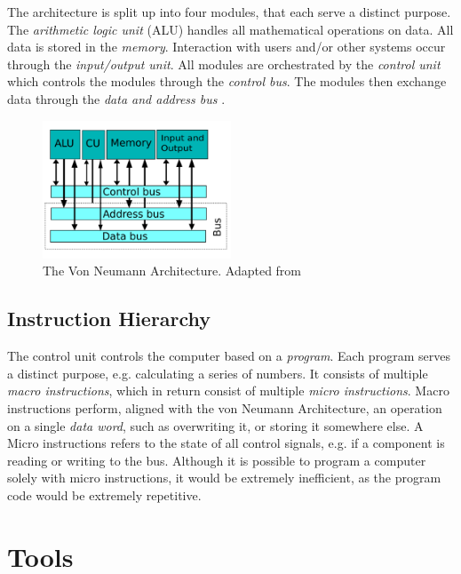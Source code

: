 The architecture is split up into four modules, that each serve a distinct purpose. The \textit{arithmetic logic unit} (ALU) handles all mathematical operations on data. All data is stored in the \textit{memory}. Interaction with users and/or other systems occur through the \textit{input/output unit}. All modules are orchestrated by the \textit{control unit} which controls the modules through the \textit{control bus}. The modules then exchange data through the \textit{data and address bus} \cite{vonneumann1} \cite{vonneumann2}.

\begin{figure}[H]
  \begin{center}
    \includegraphics[width=0.5\textwidth]{figures/VNA}
  \end{center}
  \caption{The Von Neumann Architecture. Adapted from \cite{fig-vna}}\label{fig:vna}
\end{figure}

\subsection{Instruction Hierarchy}
The control unit controls the computer based on a \textit{program}. Each program serves a distinct purpose, e.g. calculating a series of numbers. It consists of multiple \textit{macro instructions}, which in return consist of multiple \textit{micro instructions}. Macro instructions perform, aligned with the von Neumann Architecture, an operation on a single \textit{data word}, such as overwriting it, or storing it somewhere else. A Micro instructions refers to the state of all control signals, e.g. if a component is reading or writing to the bus. Although it is possible to program a computer solely with micro instructions, it would be extremely inefficient, as the program code would be extremely repetitive. \cite{malvino1983a}

\section{Tools} \label{sec:tools}

